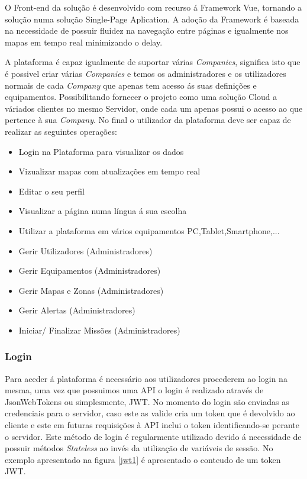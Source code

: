 \par O Front-end da solução é desenvolvido com recurso á Framework Vue, tornando a solução numa solução Single-Page Aplication. A adoção da Framework é baseada na necessidade de possuir fluidez na navegação entre páginas e igualmente nos mapas em tempo real minimizando o delay.
\par A plataforma é capaz igualmente de suportar várias \textit{Companies}, significa isto que é possivel criar várias \textit{Companies} e temos os administradores e os utilizadores normais de cada \textit{Company} que apenas tem acesso ás suas definições e equipamentos. Possibilitando fornecer o projeto como uma solução Cloud a váriados clientes no mesmo Servidor, onde cada um apenas possui o acesso ao que pertence à sua \textit{Company}.
No final o utilizador da plataforma deve ser capaz de realizar as seguintes operações:
\par
\begin{itemize}
\item Login na Plataforma para visualizar os dados
\item Vizualizar mapas com atualizações em tempo real
\item Editar o seu perfil
\item Visualizar a página numa língua á sua escolha
\item Utilizar a plataforma em vários equipamentos PC,Tablet,Smartphone,...
\item Gerir Utilizadores (Administradores)
\item Gerir Equipamentos (Administradores)
\item Gerir Mapas e Zonas (Administradores)
\item Gerir Alertas (Administradores)
\item Iniciar/ Finalizar Missões (Administradores)
\end{itemize}


\subsubsection{Login}
 
\par Para aceder á plataforma é necessário aos utilizadores procederem ao login na mesma, uma vez que possuimos uma API o login é realizado através de JsonWebTokens ou simplesmente, JWT. No momento do login são enviadas as credenciais para o servidor, caso este as valide cria um token que é devolvido ao cliente e este em futuras requisições à API inclui o token identificando-se perante o servidor. Este método de login é regularmente utilizado devido á necessidade de possuir métodos \textit{Stateless} ao invés da utilização de variáveis de sessão. No exemplo apresentado na figura \ref{jwt1} é apresentado o conteudo de um token JWT. 


